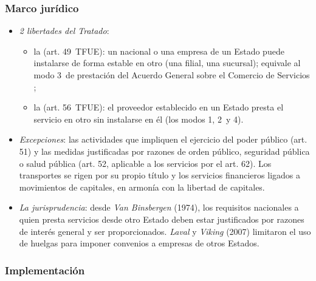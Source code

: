 \documentclass[11pt]{article}
\begin{document}
\subsubsection{Marco jurídico}\label{sec:servicios-marco}

\begin{itemize}
\item \emph{2 libertades del Tratado}:\nocite{PE2026FichaServicios}
  \begin{itemize}
  \item la  (art. 49~TFUE): un nacional o una empresa de un Estado puede instalarse de forma estable en otro (una filial, una sucursal); equivale al modo 3~de prestación del Acuerdo General sobre el Comercio de Servicios ;
  \item la  (art. 56~TFUE): el proveedor establecido en un Estado presta el servicio en otro sin instalarse en él (los modos 1, 2~y 4).
  \end{itemize}
\item \emph{Excepciones}: las actividades que impliquen el ejercicio del poder público (art. 51) y las medidas justificadas por razones de orden público, seguridad pública o salud pública (art. 52, aplicable a los servicios por el art. 62). Los transportes se rigen por su propio título y los servicios financieros ligados a movimientos de capitales, en armonía con la libertad de capitales.
\item \emph{La jurisprudencia}: desde \emph{Van Binsbergen} (1974), los requisitos nacionales a quien presta servicios desde otro Estado deben estar justificados por razones de interés general y ser proporcionados. \emph{Laval} y \emph{Viking} (2007) limitaron el uso de huelgas para imponer convenios a empresas de otros Estados.
\end{itemize}

\subsubsection{Implementación}\label{sec:servicios-implementacion}
\end{document}
